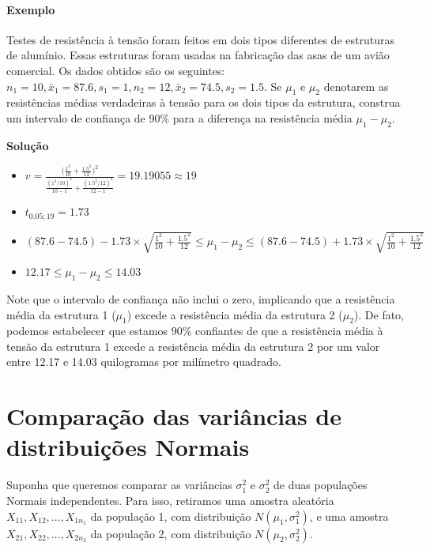 \documentclass[
]{book}
\providecommand{\tightlist}{%
  \setlength{\itemsep}{0pt}\setlength{\parskip}{0pt}}
\begin{document}
\hypertarget{exemplo-14}{%
\paragraph{Exemplo}\label{exemplo-14}}

Testes de resistência à tensão foram feitos em dois tipos diferentes de estruturas de alumínio. Essas estruturas foram usadas na fabricação das asas de um avião comercial. Os dados obtidos são os seguintes: \(n_1=10, \bar x_1=87.6, s_1=1, n_2=12, \bar x_2=74.5, s_2=1.5\). Se \(\mu_1\) e \(\mu_2\) denotarem as resistências médias verdadeiras à tensão para os dois tipos da estrutura, construa um intervalo de confiança de 90\% para a diferença na resistência média \(\mu_1-\mu_2\).

\textbf{Solução}

\begin{itemize}
\tightlist
\item
  \(v=\frac{\Big(\frac{1^2}{10}+\frac{1.5^2}{12}\Big)^2}{\frac{(1^2/10)^2}{10-1}+\frac{(1.5^2/12)^2}{12-1}}=19.19055\approx19\)
\item
  \(t_{0.05;19}=1.73\)
\item
  \((87.6-74.5) -1.73\times \sqrt{\frac{1^2}{10}+\frac{1.5^2}{12}}\leq \mu_1-\mu_2 \leq (87.6-74.5) +1.73\times \sqrt{\frac{1^2}{10}+\frac{1.5^2}{12}}\)
\item
  \(12.17 \leq \mu_1-\mu_2 \leq 14.03\)
\end{itemize}

Note que o intervalo de confiança não inclui o zero, implicando que a resistência média da estrutura 1 (\(\mu_1\)) excede a resistência média da estrutura 2 (\(\mu_2\)). De fato, podemos estabelecer que estamos 90\% confiantes de que a resistência média à tensão da estrutura 1 excede a resistência média da estrutura 2 por um valor entre 12.17 e 14.03 quilogramas por milímetro quadrado.

\hypertarget{comparauxe7uxe3o-das-variuxe2ncias-de-distribuiuxe7uxf5es-normais}{%
\section{Comparação das variâncias de distribuições Normais}\label{comparauxe7uxe3o-das-variuxe2ncias-de-distribuiuxe7uxf5es-normais}}

Suponha que queremos comparar as variâncias \(\sigma^2_1\) e \(\sigma^2_2\) de duas populações Normais independentes. Para isso, retiramos uma amostra aleatória \(X_{11},X_{12},\ldots,X_{1n_1}\) da população 1, com distribuição \(N(\mu_1,\sigma^2_1)\), e uma amostra \(X_{21},X_{22},\ldots,X_{2n_2}\) da população 2, com distribuição \(N(\mu_2,\sigma^2_2)\).
\end{document}
